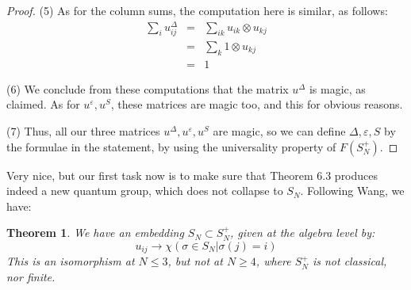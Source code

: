 \documentclass[12pt]{amsbook}
\newtheorem{theorem}{Theorem}[chapter]
\begin{document}
\begin{proof}
(5) As for the column sums, the computation here is similar, as follows:
\begin{eqnarray*}
\sum_iu_{ij}^\Delta
&=&\sum_{ik}u_{ik}\otimes u_{kj}\\
&=&\sum_k1\otimes u_{kj}\\
&=&1
\end{eqnarray*}

(6) We conclude from these computations that the matrix $u^\Delta$ is magic, as claimed. As for $u^\varepsilon,u^S$, these matrices are magic too, and this for obvious reasons. 

\medskip

(7) Thus, all our three matrices $u^\Delta,u^\varepsilon,u^S$ are magic, so we can define $\Delta,\varepsilon,S$ by the formulae in the statement, by using the universality property of $F(S_N^+)$.
\end{proof}

Very nice, but our first task now is to make sure that Theorem 6.3 produces indeed a new quantum group, which does not collapse to $S_N$. Following Wang, we have:


\begin{theorem}
We have an embedding $S_N\subset S_N^+$, given at the algebra level by: 
$$u_{ij}\to\chi\left(\sigma\in S_N\Big|\sigma(j)=i\right)$$
This is an isomorphism at $N\leq3$, but not at $N\geq4$, where $S_N^+$ is not classical, nor finite.
\end{theorem} 
\end{document}
